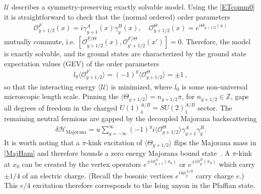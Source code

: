 $\mathcal{U}$ describes a symmetry-preserving exactly solvable model. Using the \ETCR \eqref{ETcomm0} it is straightforward to check that the (normal ordered) order parameters \begin{align}\mathcal{O}_{y+1/2}^F(x)=i\gamma^A_{y+1}(x)\gamma^B_y(x),\quad\mathcal{O}_{y+1/2}^\Theta(x)=e^{i\Theta_{y+1/2}(x)}\label{orderparameters}\end{align} mutually commute, i.e. $\left[\mathcal{O}_{y+1/2}^{F/\Theta}(x),\mathcal{O}_{y'+1/2}^{F/\Theta}(x')\right]=0$. Therefore, the model is exactly solvable, and its ground states are characterized by the ground state expectation values (\hypertarget{GEV}{GEV}) of the order parameters \begin{align}l_0\langle\mathcal{O}_{y+1/2}^F\rangle=(-1)^y\langle\mathcal{O}_{y+1/2}^\Theta\rangle=\pm1 \,, \end{align} so that the interacting energy $\langle\mathcal{U}\rangle$ is minimized, where $l_0$ is some non-universal microscopic length scale. Pinning the \GEV $\langle\Theta_{y+1/2}\rangle=n_{y+1/2}\pi$, for $n_{y+1/2}\in\mathbb{Z}$, gaps all degrees of freedom in the charged $U(1)_4^{A/B}=SU(2)_1^{A/B}$ sector. The remaining neutral fermions are gapped by the decoupled Majorana backscattering \begin{align}\delta\mathcal{H}_{\mathrm{Majorana}}=u\sum_{y=-\infty}^\infty(-1)^yi\langle\mathcal{O}^\Theta_{y+1/2}\rangle\gamma^A_{y+1}\gamma^B_y.\label{MajHam}\end{align} It is worth noting that a $\pi$-kink excitation of $\langle\Theta_{y+1/2}\rangle$ flips the Majorana mass in \eqref{MajHam} and therefore bounds a zero energy Majorana bound state~\cite{Kitaevchain}. A $\pi$-kink at $x_0$ can be created by the vertex operators $e^{\pm i\phi^A_{y+1}(x_0)}$ or $e^{\pm i\phi^B_y(x_0)}$ which carry $\pm1/4$ of an electric charge. (Recall the bosonic vertices $e^{i4\phi^{A/B}_y}$ carry charge $e$.) This $e/4$ excitation therefore corresponds to the Ising anyon in the Pfaffian \FQH state.

